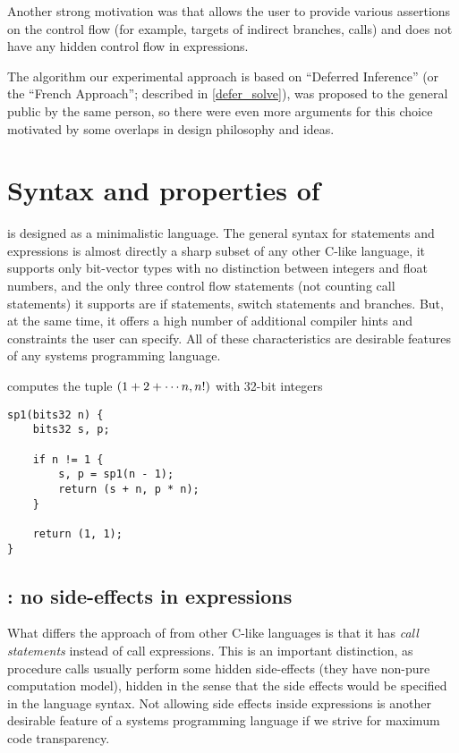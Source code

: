 Another strong motivation was that \cmm allows the user to provide various assertions on the control flow (for example, targets of indirect branches, calls) and does not have any hidden control flow in expressions.

The algorithm our experimental approach is based on ``Deferred Inference'' (or the ``French Approach''; described in \cref{defer_solve}), was proposed to the general public by the same person, so there were even more arguments for this choice motivated by some overlaps in design philosophy and ideas.

\section{Syntax and properties of \cmm}

\cmm is designed as a minimalistic language. The general syntax for statements and expressions is almost directly a sharp subset of any other C-like language, it supports only bit-vector types with no distinction between integers and float numbers, and the only three control flow statements (not counting call statements) it supports are if statements, switch statements and branches. But, at the same time, it offers a high number of additional compiler hints and constraints the user can specify. All of these characteristics are desirable features of any systems programming language.

\begin{ex}
     computes the tuple $\left(1 + 2 + \cdots n, n!\right)$ with 32-bit integers
    \begin{lstlisting}
sp1(bits32 n) {
    bits32 s, p;

    if n != 1 {
        s, p = sp1(n - 1);
        return (s + n, p * n);
    }

    return (1, 1);
}
    \end{lstlisting}
\end{ex}

\subsection{\cmm: no side-effects in expressions}

What differs the approach of \cmm from other C-like languages is that it has \emph{call statements} instead of call expressions. This is an important distinction, as procedure calls usually perform some hidden side-effects (they have non-pure computation model), hidden in the sense that the side effects would be specified in the language syntax. Not allowing side effects inside expressions is another desirable feature of a systems programming language if we strive for maximum code transparency.


